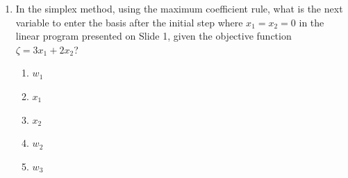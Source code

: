\documentclass{article}%
\begin{document}
\begin{enumerate}
\begin{enumerate}
\begin{enumerate}
\end{enumerate}%
\vspace{0.5em}%
\end{enumerate}%
\item In the simplex method, using the maximum coefficient rule, what is the next variable to enter the basis after the initial step where $x_1 = x_2 = 0$ in the linear program presented on Slide 1, given the objective function $\zeta = 3x_1 + 2x_2$?%
\begin{enumerate}%
\item $w_1$%
\item $x_1$%
\item $x_2$%
\item $w_2$%
\item $w_3$%
\end{enumerate}%
\vspace{1em}%
\end{enumerate}

%
\newpage%
\end{document}
